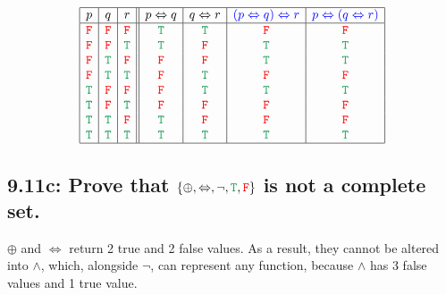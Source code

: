 \documentclass{article}
\begin{document}
\[\begin{array}{|c|c|c||c|c|c|c|}
\hline
p&q&r&p\Leftrightarrow q&q\Leftrightarrow r&\textcolor{blue}{(p\Leftrightarrow q)\Leftrightarrow r}&\textcolor{blue}{p\Leftrightarrow(q\Leftrightarrow r)}\\
\hline
\textcolor{red}{\tt{F}}&\textcolor{red}{\tt{F}}&\textcolor{red}{\tt{F}}&\textcolor{ForestGreen}{\tt{T}}&\textcolor{ForestGreen}{\tt{T}}&\textcolor{red}{\tt{F}}&\textcolor{red}{\tt{F}}\\
\textcolor{red}{\tt{F}}&\textcolor{red}{\tt{F}}&\textcolor{ForestGreen}{\tt{T}}&\textcolor{ForestGreen}{\tt{T}}&\textcolor{red}{\tt{F}}&\textcolor{ForestGreen}{\tt{T}}&\textcolor{ForestGreen}{\tt{T}}\\
\textcolor{red}{\tt{F}}&\textcolor{ForestGreen}{\tt{T}}&\textcolor{red}{\tt{F}}&\textcolor{red}{\tt{F}}&\textcolor{red}{\tt{F}}&\textcolor{ForestGreen}{\tt{T}}&\textcolor{ForestGreen}{\tt{T}}\\
\textcolor{red}{\tt{F}}&\textcolor{ForestGreen}{\tt{T}}&\textcolor{ForestGreen}{\tt{T}}&\textcolor{red}{\tt{F}}&\textcolor{ForestGreen}{\tt{T}}&\textcolor{red}{\tt{F}}&\textcolor{red}{\tt{F}}\\
\textcolor{ForestGreen}{\tt{T}}&\textcolor{red}{\tt{F}}&\textcolor{red}{\tt{F}}&\textcolor{red}{\tt{F}}&\textcolor{ForestGreen}{\tt{T}}&\textcolor{ForestGreen}{\tt{T}}&\textcolor{ForestGreen}{\tt{T}}\\
\textcolor{ForestGreen}{\tt{T}}&\textcolor{red}{\tt{F}}&\textcolor{ForestGreen}{\tt{T}}&\textcolor{red}{\tt{F}}&\textcolor{red}{\tt{F}}&\textcolor{red}{\tt{F}}&\textcolor{red}{\tt{F}}\\
\textcolor{ForestGreen}{\tt{T}}&\textcolor{ForestGreen}{\tt{T}}&\textcolor{red}{\tt{F}}&\textcolor{ForestGreen}{\tt{T}}&\textcolor{red}{\tt{F}}&\textcolor{red}{\tt{F}}&\textcolor{red}{\tt{F}}\\
\textcolor{ForestGreen}{\tt{T}}&\textcolor{ForestGreen}{\tt{T}}&\textcolor{ForestGreen}{\tt{T}}&\textcolor{ForestGreen}{\tt{T}}&\textcolor{ForestGreen}{\tt{T}}&\textcolor{ForestGreen}{\tt{T}}&\textcolor{ForestGreen}{\tt{T}}\\
\hline
\end{array}\]
\subsection*{9.11c: Prove that $\{\oplus,\Leftrightarrow,\neg,\textcolor{ForestGreen}{\tt{T}},\textcolor{red}{\tt{F}}\}$ is not a complete set.}
$\oplus$ and $\Leftrightarrow$ return 2 true and 2 false values. As a result, they cannot be altered into $\land$, which, alongside $\neg$, can represent any function, because $\land$ has 3 false values and 1 true value.
\end{document}
